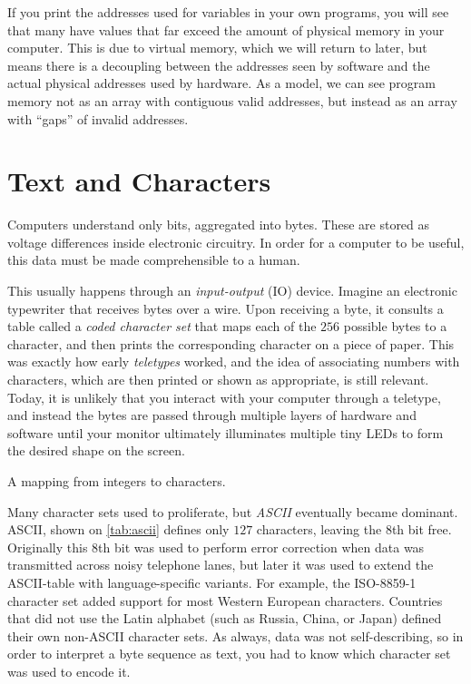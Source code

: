 If you print the addresses used for variables in your own programs,
you will see that many have values that far exceed the amount of
physical memory in your computer.  This is due to virtual memory,
which we will return to later, but means there is a decoupling between
the addresses seen by software and the actual physical addresses used
by hardware.  As a model, we can see program memory not as an array
with contiguous valid addresses, but instead as an array with ``gaps''
of invalid addresses.

\section{Text and Characters}
\label{sec:text}

Computers understand only bits, aggregated into bytes.  These are
stored as voltage differences inside electronic circuitry.  In order
for a computer to be useful, this data must be made comprehensible to
a human.

This usually happens through an \emph{input-output} (IO) device.
Imagine an electronic typewriter that receives bytes over a wire. Upon
receiving a byte, it consults a table called a \emph{coded character
  set} that maps each of the $256$ possible bytes to a character, and
then prints the corresponding character on a piece of paper. This was
exactly how early \emph{teletypes} worked, and the idea of associating
numbers with characters, which are then printed or shown as
appropriate, is still relevant. Today, it is unlikely that you
interact with your computer through a teletype, and instead the bytes
are passed through multiple layers of hardware and software until your
monitor ultimately illuminates multiple tiny LEDs to form the desired
shape on the screen.

\begin{definition}
  A mapping from integers to characters.
\end{definition}

Many character sets used to proliferate, but \emph{ASCII} eventually
became dominant.  ASCII, shown on \cref{tab:ascii} defines only $127$
characters, leaving the 8th bit free.  Originally this 8th bit was
used to perform error correction when data was transmitted across
noisy telephone lanes, but later it was used to extend the ASCII-table
with language-specific variants.  For example, the ISO-8859-1
character set added support for most Western European characters.
Countries that did not use the Latin alphabet (such as Russia, China,
or Japan) defined their own non-ASCII character sets.  As always, data
was not self-describing, so in order to interpret a byte sequence as
text, you had to know which character set was used to encode it.


